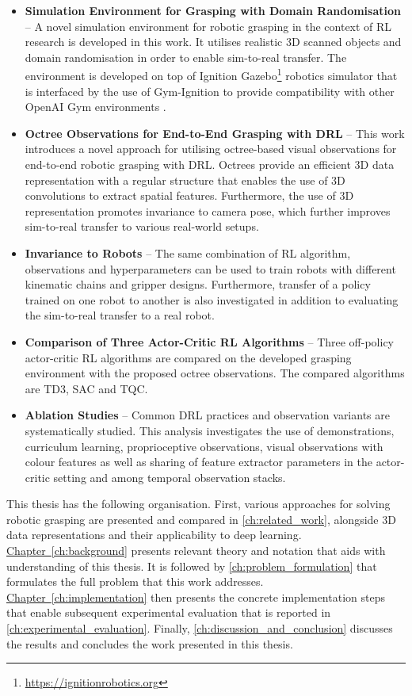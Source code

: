 \begin{itemize}
    \item \textbf{Simulation Environment for Grasping with Domain Randomisation} -- A novel simulation environment for robotic grasping in the context of RL research is developed in this work. It utilises realistic 3D scanned objects and domain randomisation in order to enable sim-to-real transfer. The environment is developed on top of Ignition Gazebo\footnote{\href{https://ignitionrobotics.org}{https://ignitionrobotics.org}} robotics simulator that is interfaced by the use of Gym-Ignition \cite{ferigo_gym-ignition_2020} to provide compatibility with other OpenAI Gym environments \cite{brockman_openai_2016}.
    \item \textbf{Octree Observations for End-to-End Grasping with DRL} -- This work introduces a novel approach for utilising octree-based visual observations for end-to-end robotic grasping with DRL. Octrees provide an efficient 3D data representation with a regular structure that enables the use of 3D convolutions to extract spatial features. Furthermore, the use of 3D representation promotes invariance to camera pose, which further improves sim-to-real transfer to various real-world setups.
    \item \textbf{Invariance to Robots} -- The same combination of RL algorithm, observations and hyperparameters can be used to train robots with different kinematic chains and gripper designs. Furthermore, transfer of a policy trained on one robot to another is also investigated in addition to evaluating the sim-to-real transfer to a real robot.
    \item \textbf{Comparison of Three Actor-Critic RL Algorithms} -- Three off-policy actor-critic RL algorithms are compared on the developed grasping environment with the proposed octree observations. The compared algorithms are TD3, SAC and TQC.
    \item \textbf{Ablation Studies} -- Common DRL practices and observation variants are systematically studied. This analysis investigates the use of demonstrations, curriculum learning, proprioceptive observations, visual observations with colour features as well as sharing of feature extractor parameters in the actor-critic setting and among temporal observation stacks.
\end{itemize}

This thesis has the following organisation. First, various approaches for solving robotic grasping are presented and compared in \autoref{ch:related_work}, alongside 3D data representations and their applicability to deep learning. \hyperref[ch:background]{Chapter~\ref*{ch:background}} presents relevant theory and notation that aids with understanding of this thesis. It is followed by \autoref{ch:problem_formulation} that formulates the full problem that this work addresses. \hyperref[ch:implementation]{Chapter~\ref*{ch:implementation}} then presents the concrete implementation steps that enable subsequent experimental evaluation that is reported in \autoref{ch:experimental_evaluation}. Finally, \autoref{ch:discussion_and_conclusion} discusses the results and concludes the work presented in this thesis.
